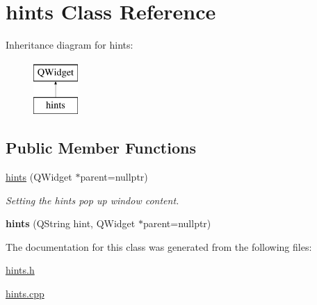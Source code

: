\hypertarget{classhints}{\section{hints Class Reference}
\label{classhints}
}
Inheritance diagram for hints\-:\begin{figure}[H]
\begin{center}
\leavevmode
\includegraphics[height=2.000000cm]{classhints}
\end{center}
\end{figure}
\subsection*{Public Member Functions}
\begin{DoxyCompactItemize}
\item 
\hypertarget{classhints_a2d10c2dc601483be08f4ee46f1a6f209}{\hyperlink{classhints_a2d10c2dc601483be08f4ee46f1a6f209}{hints} (Q\-Widget $\ast$parent=nullptr)}\label{classhints_a2d10c2dc601483be08f4ee46f1a6f209}

\begin{DoxyCompactList}\small\item\em Setting the hints pop up window content. \end{DoxyCompactList}\item 
\hypertarget{classhints_aa0d8580e6afded471d91c78e9324c557}{{\bfseries hints} (Q\-String hint, Q\-Widget $\ast$parent=nullptr)}\label{classhints_aa0d8580e6afded471d91c78e9324c557}

\end{DoxyCompactItemize}


The documentation for this class was generated from the following files\-:\begin{DoxyCompactItemize}
\item 
\hyperlink{hints_8h}{hints.\-h}\item 
\hyperlink{hints_8cpp}{hints.\-cpp}\end{DoxyCompactItemize}
